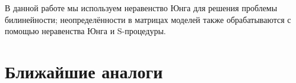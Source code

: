 В данной работе мы используем неравенство Юнга для решения проблемы билинейности; неопределённости в матрицах моделей также обрабатываются с помощью неравенства Юнга и S-процедуры.
\section{Ближайшие аналоги}\label{sec:ch1/sec7}
\FloatBarrier
